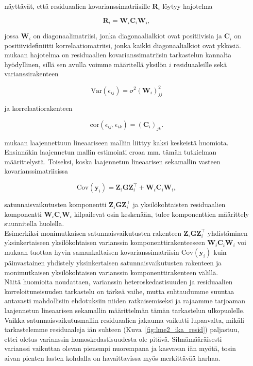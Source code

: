 \documentclass[finnish]{docopts}
\begin{document}
\cite{pinheiro00} näyttävät, että residuaalien kovarianssimatriisille $\bm{R}_i$ löytyy hajotelma

$$
\bm{R}_i = \bm{W}_i \bm{C}_i \bm{W}_i,
$$

jossa $\bm{W}_i$ on diagonaalimatriisi, jonka diagonaalialkiot ovat positiivisia ja $\bm{C}_i$ on positiividefiniitti korrelaatiomatriisi, jonka kaikki diagonaalialkiot ovat ykkösiä. \cite{pinheiro00} mukaan hajotelma on residuaalien kovarianssimatriisin tarkastelun kannalta hyödyllinen, sillä sen avulla voimme määritellä yksilön $i$ residuaaleille sekä varianssirakenteen 

$$
\text{Var}(\epsilon_{ij}) = \sigma^2(\bm{W}_i)^2_{jj}
$$

ja korrelaatiorakenteen

$$
\text{cor}(\epsilon_{ij}, \epsilon_{ik}) = (\bm{C}_i)_{jk}.
$$

\cite{pinheiro00} mukaan laajennettuun lineaariseen malliin liittyy kaksi keskeistä huomiota. Ensinnäkin laajennetun mallin estimointi eroaa mm. tämän tutkielman määrittelystä. Toiseksi, koska laajennetun lineaarisen sekamallin vasteen kovarianssimatriisissa

$$
\text{Cov}(\bm{y}_i) = \bm{Z}_i \bm{G} \bm{Z}_i^\top +  \bm{W}_i \bm{C}_i \bm{W}_i,
$$

satunnaisvaikutusten komponentti $\bm{Z}_i \bm{G} \bm{Z}_i^\top$ ja yksilökohtaisten residuaalien komponentti $\bm{W}_i \bm{C}_i \bm{W}_i$ kilpailevat osin keskenään, tulee komponenttien määrittely suunnitella huolella.\\

Esimerkiksi monimutkaisen satunnaisvaikutusten rakenteen $\bm{Z}_i \bm{G} \bm{Z}_i^\top$ yhdistäminen yksinkertaiseen yksilökohtaisen varianssin komponenttirakenteeseen $\bm{W}_i \bm{C}_i \bm{W}_i$ voi \cite{pinheiro00} mukaan tuottaa hyvin samankaltaisen kovarianssimatriisin $\text{Cov}(\bm{y}_i)$ kuin päinvastainen yhdistely yksinkertaisen satunnaisvaikutusten rakenteen ja monimutkaisen yksilökohtaisen varianssin komponenttirakenteen välillä.\\

Näitä huomioita noudattaen, varianssin heteroskedastisuuden ja residuaalien korreloituneisuuden tarkastelu on tärkeä vaihe, mutta suhtaudumme suuntaa antavasti mahdollisiin ehdotuksiin niiden ratkaisemiseksi ja rajaamme \cite{pinheiro00} tarjoaman laajennetun lineaarisen sekamallin määrittelmän tämän tarkastelun ulkopuolelle.\\

Vaikka satunnaisvaikutusmallin residuaalien jakauma vaikutti lupaavalta, mikäli tarkastelemme residuaaleja iän suhteen (Kuva~\ref{fig:lme2_ika_resid}) paljastuu, ettei oletus varianssin homoskedastisuudesta ole pitävä. Silmämääräisesti varianssi vaikuttaa olevan pienempi nuorempana ja kasvavan iän myötä, tosin aivan pienten lasten kohdalla on havaittavissa myös merkittävää harhaa.\\
\end{document}
